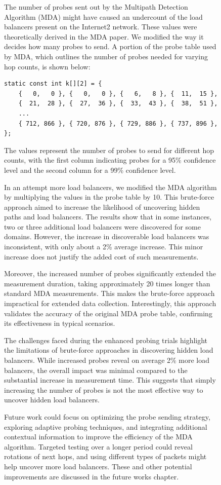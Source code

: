 \documentclass[12pt]{cwru_thesis}
\begin{document}
\begin{figure}[h!]
The number of probes sent out by the Multipath Detection Algorithm (MDA) might have caused an undercount of the load balancers present on the Internet2 network. These values were theoretically derived in the MDA paper. We modified the way it decides how many probes to send. A portion of the probe table used by MDA, which outlines the number of probes needed for varying hop counts, is shown below:

\begin{verbatim}
static const int k[][2] = {
    {   0,   0 }, {   0,   0 }, {   6,   8 }, {  11,  15 },
    {  21,  28 }, {  27,  36 }, {  33,  43 }, {  38,  51 }, 
    ...
    { 712, 866 }, { 720, 876 }, { 729, 886 }, { 737, 896 }, 
};
\end{verbatim}

The values represent the number of probes to send for different hop counts, with the first column indicating probes for a 95\% confidence level and the second column for a 99\% confidence level.

In an attempt more load balancers, we modified the MDA algorithm by multiplying the values in the probe table by 10. This brute-force approach aimed to increase the likelihood of uncovering hidden paths and load balancers. The results show that in some instances, two or three additional load balancers were discovered for some domains. However, the increase in discoverable load balancers was inconsistent, with only about a 2\% average increase. This minor increase does not justify the added cost of such measurements.

Moreover, the increased number of probes significantly extended the measurement duration, taking approximately 20 times longer than standard MDA measurements. This makes the brute-force approach impractical for extended data collection. Interestingly, this approach validates the accuracy of the original MDA probe table, confirming its effectiveness in typical scenarios.

The challenges faced during the enhanced probing trials highlight the limitations of brute-force approaches in discovering hidden load balancers. While increased probes reveal on average 2\% more load balancers, the overall impact was minimal compared to the substantial increase in measurement time. This suggests that simply increasing the number of probes is not the most effective way to uncover hidden load balancers.

Future work could focus on optimizing the probe sending strategy, exploring adaptive probing techniques, and integrating additional contextual information to improve the efficiency of the MDA algorithm. Targeted testing over a longer period could reveal rotations of next hops, and using different types of packets might help uncover more load balancers. These and other potential improvements are discussed in the future works chapter.




\end{figure}
\end{document}
